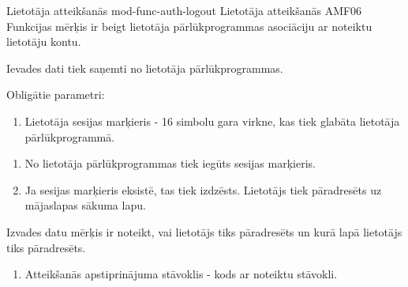 \moduleFunctionTable
{Lietotāja atteikšanās}
{mod-func-auth-logout}
{Lietotāja atteikšanās}
{AMF06}
{
	Funkcijas mērķis ir beigt lietotāja pārlūkprogrammas asociāciju ar noteiktu lietotāju kontu.
}
{
	Ievades dati tiek saņemti no lietotāja pārlūkprogrammas.

	Obligātie parametri:
	\begin{enumerate}
		\item Lietotāja sesijas marķieris - 16 simbolu gara virkne, kas tiek glabāta lietotāja pārlūkprogrammā.
	\end{enumerate}

}
{
	\begin{enumerate}
		\item No lietotāja pārlūkprogrammas tiek iegūts sesijas marķieris.
		\item Ja sesijas marķieris eksistē, tas tiek izdzēsts.
		      Lietotājs tiek pāradresēts uz mājaslapas sākuma lapu.
	\end{enumerate}
}
{
	Izvades datu mērķis ir noteikt, vai lietotājs tiks pāradresēts un kurā lapā lietotājs tiks pāradresēts.
	\begin{enumerate}
		\item Atteikšanās apstiprinājuma stāvoklis - kods ar noteiktu stāvokli.
	\end{enumerate}
}
{}
